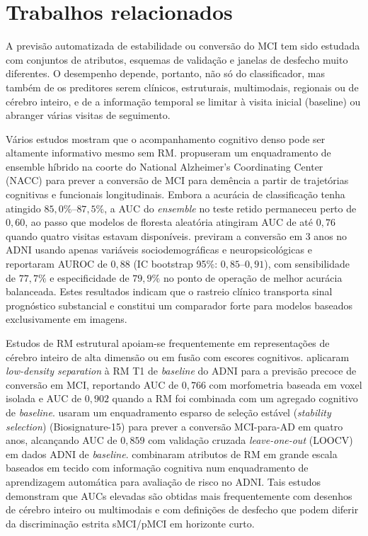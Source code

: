 \documentclass[review]{elsarticle}
\begin{document}
\section{Trabalhos relacionados}\label{sec:Related-Works}

A previsão automatizada de estabilidade ou conversão do MCI tem sido estudada com conjuntos de atributos, esquemas de validação e janelas de desfecho muito diferentes. O desempenho depende, portanto, não só do classificador, mas também de os preditores serem clínicos, estruturais, multimodais, regionais ou de cérebro inteiro, e de a informação temporal se limitar à visita inicial (baseline) ou abranger várias visitas de seguimento.

Vários estudos mostram que o acompanhamento cognitivo denso pode ser altamente informativo mesmo sem RM. \citet{bucholc-2023} propuseram um enquadramento de ensemble híbrido na coorte do National Alzheimer's Coordinating Center (NACC) para prever a conversão de MCI para demência a partir de trajetórias cognitivas e funcionais longitudinais. Embora a acurácia de classificação tenha atingido $85,0\%$--$87,5\%$, a AUC do \emph{ensemble} no teste retido permaneceu perto de $0,60$, ao passo que modelos de floresta aleatória atingiram AUC de até $0,76$ quando quatro visitas estavam disponíveis. \citet{grassi-2019} previram a conversão em 3 anos no ADNI usando apenas variáveis sociodemográficas e neuropsicológicas e reportaram AUROC de $0,88$ (IC bootstrap 95\%: $0,85$--$0,91$), com sensibilidade de $77,7\%$ e especificidade de $79,9\%$ no ponto de operação de melhor acurácia balanceada. Estes resultados indicam que o rastreio clínico transporta sinal prognóstico substancial e constitui um comparador forte para modelos baseados exclusivamente em imagens.

Estudos de RM estrutural apoiam-se frequentemente em representações de cérebro inteiro de alta dimensão ou em fusão com escores cognitivos. \citet{moradi-2015} aplicaram \emph{low-density separation} à RM T1 de \textit{baseline} do ADNI para a previsão precoce de conversão em MCI, reportando AUC de $0,766$ com morfometria baseada em voxel isolada e AUC de $0,902$ quando a RM foi combinada com um agregado cognitivo de \textit{baseline}. \citet{ye-2012} usaram um enquadramento esparso de seleção estável (\emph{stability selection}) (Biosignature-15) para prever a conversão MCI-para-AD em quatro anos, alcançando AUC de $0,859$ com validação cruzada \emph{leave-one-out} (LOOCV) em dados ADNI de \textit{baseline}. \citet{casanova-2013} combinaram atributos de RM em grande escala baseados em tecido com informação cognitiva num enquadramento de aprendizagem automática para avaliação de risco no ADNI. Tais estudos demonstram que AUCs elevadas são obtidas mais frequentemente com desenhos de cérebro inteiro ou multimodais e com definições de desfecho que podem diferir da discriminação estrita sMCI/pMCI em horizonte curto.
\end{document}
